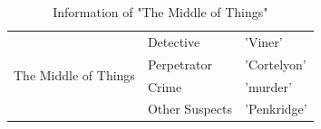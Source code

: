 \documentclass{article}
\begin{document}
\begin{table}[htbp]
\centering
\caption{Information of "The Middle of Things"}
\begin{tabular}{@{}l|l|l@{}}
\toprule
\multirow{6}{*}{The Middle of Things} & Detective      & 'Viner'                                                                                                                                                                                                                                                                                                                                                                                                                                                                                                                                                        \\ \cmidrule(l){2-3} 
                                      & Perpetrator    & 'Cortelyon'                                                                                                                                                                                                                                                                                                                                                                                                                                                                                                                                                    \\ \cmidrule(l){2-3} 
                                      & Crime          & 'murder'                                                                                                                                                                                                                                                                                                                                                                                                                                                                                                                                                       \\ \cmidrule(l){2-3} 
                                      & Other Suspects & 'Penkridge'                                                                                                                                                                                                                                                                                                                                                                                                                                                                                                                                                    \\ \cmidrule(l){2-3} 

\end{tabular}
\end{table}
\end{document}

